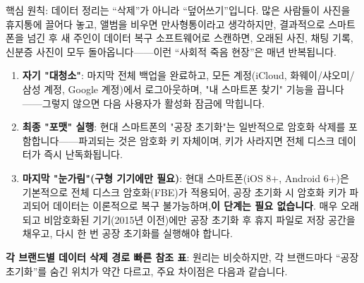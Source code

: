 


핵심 원칙: 데이터 정리는 “삭제”가 아니라 “덮어쓰기”입니다. 많은 사람들이 사진을 휴지통에 끌어다 놓고, 앨범을 비우면 만사형통이라고 생각하지만, 결과적으로 스마트폰을 넘긴 후 새 주인이 데이터 복구 소프트웨어로 스캔하면, 오래된 사진, 채팅 기록, 신분증 사진이 모두 돌아옵니다——이런 “사회적 죽음 현장”은 매년 반복됩니다.

\begin{enumerate}
  \item \textbf{자기 "대청소"}: 마지막 전체 백업을 완료하고, 모든 계정(iCloud, 화웨이/샤오미/삼성 계정, Google 계정)에서 로그아웃하며, "내 스마트폰 찾기" 기능을 끕니다——그렇지 않으면 다음 사용자가 활성화 잠금에 막힙니다.
  \item \textbf{최종 "포맷" 실행}: 현대 스마트폰의 "공장 초기화"는 일반적으로 암호화 삭제를 포함합니다——파괴되는 것은 암호화 키 자체이며, 키가 사라지면 전체 디스크 데이터가 즉시 난독화됩니다.
  \item \textbf{마지막 "눈가림"(구형 기기에만 필요)}: 현대 스마트폰(iOS 8+, Android 6+)은 기본적으로 전체 디스크 암호화(FBE)가 적용되어, 공장 초기화 시 암호화 키가 파괴되어 데이터는 이론적으로 복구 불가능하며,\textbf{이 단계는 필요 없습니다}. 매우 오래되고 비암호화된 기기(2015년 이전)에만 공장 초기화 후 휴지 파일로 저장 공간을 채우고, 다시 한 번 공장 초기화를 실행해야 합니다.
\end{enumerate}

\textbf{각 브랜드별 데이터 삭제 경로 빠른 참조 표}: 원리는 비슷하지만, 각 브랜드마다 “공장 초기화”를 숨긴 위치가 약간 다르고, 주요 차이점은 다음과 같습니다.

